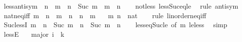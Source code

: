 \begin{isabellebody}
\isamarkupfalse%
\ less{\isacharunderscore}{\kern0pt}antisym{\isacharcolon}{\kern0pt}\ {\isachardoublequoteopen}{\isasymnot}\ n\ {\isacharless}{\kern0pt}\ m\ {\isasymLongrightarrow}\ n\ {\isacharless}{\kern0pt}\ Suc\ m\ {\isasymLongrightarrow}\ m\ {\isacharequal}{\kern0pt}\ n{\isachardoublequoteclose}\isanewline
%
\isadelimproof
\ \ %
\endisadelimproof
%
\isatagproof
{}\isamarkupfalse%
\ not{\isacharunderscore}{\kern0pt}less\ less{\isacharunderscore}{\kern0pt}Suc{\isacharunderscore}{\kern0pt}eq{\isacharunderscore}{\kern0pt}le\ \isamarkupfalse%
\ {\isacharparenleft}{\kern0pt}rule\ antisym{\isacharparenright}{\kern0pt}%
\endisatagproof
{\isafoldproof}%
%
\isadelimproof
\isanewline
%
\endisadelimproof
\isanewline
{}\isamarkupfalse%
\ nat{\isacharunderscore}{\kern0pt}neq{\isacharunderscore}{\kern0pt}iff{\isacharcolon}{\kern0pt}\ {\isachardoublequoteopen}m\ {\isasymnoteq}\ n\ {\isasymlongleftrightarrow}\ m\ {\isacharless}{\kern0pt}\ n\ {\isasymor}\ n\ {\isacharless}{\kern0pt}\ m{\isachardoublequoteclose}\isanewline
\ \ \ m\ n\ {\isacharcolon}{\kern0pt}{\isacharcolon}{\kern0pt}\ nat\isanewline
%
\isadelimproof
\ \ %
\endisadelimproof
%
\isatagproof
{}\isamarkupfalse%
\ {\isacharparenleft}{\kern0pt}rule\ linorder{\isacharunderscore}{\kern0pt}neq{\isacharunderscore}{\kern0pt}iff{\isacharparenright}{\kern0pt}%
\endisatagproof
{\isafoldproof}%
%
\isadelimproof
%
\endisadelimproof
%
\isadelimdocument
%
\endisadelimdocument
%
\isatagdocument
%
\isamarkuptrue%
%
\endisatagdocument
{\isafolddocument}%
%
\isadelimdocument
%
\endisadelimdocument
{}\isamarkupfalse%
\ Suc{\isacharunderscore}{\kern0pt}lessI{\isacharcolon}{\kern0pt}\ {\isachardoublequoteopen}m\ {\isacharless}{\kern0pt}\ n\ {\isasymLongrightarrow}\ Suc\ m\ {\isasymnoteq}\ n\ {\isasymLongrightarrow}\ Suc\ m\ {\isacharless}{\kern0pt}\ n{\isachardoublequoteclose}\isanewline
%
\isadelimproof
\ \ %
\endisadelimproof
%
\isatagproof
{}\isamarkupfalse%
\ less{\isacharunderscore}{\kern0pt}eq{\isacharunderscore}{\kern0pt}Suc{\isacharunderscore}{\kern0pt}le\ {\isacharbrackleft}{\kern0pt}of\ m{\isacharbrackright}{\kern0pt}\ le{\isacharunderscore}{\kern0pt}less\ \isamarkupfalse%
\ simp%
\endisatagproof
{\isafoldproof}%
%
\isadelimproof
\isanewline
%
\endisadelimproof
\isanewline
{}\isamarkupfalse%
\ lessE{\isacharcolon}{\kern0pt}\isanewline
\ \ \ major{\isacharcolon}{\kern0pt}\ {\isachardoublequoteopen}i\ {\isacharless}{\kern0pt}\ k{\isachardoublequoteclose}\isanewline

\end{isabellebody}
